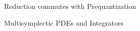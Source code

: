 \documentclass[handout,10pt]{beamer}
\begin{document}
\begin{frame}{Reduction commutes with Prequantization}

\end{frame}

\begin{frame}{Multisymplectic PDEs and Integrators}

\end{frame}
\end{document}
